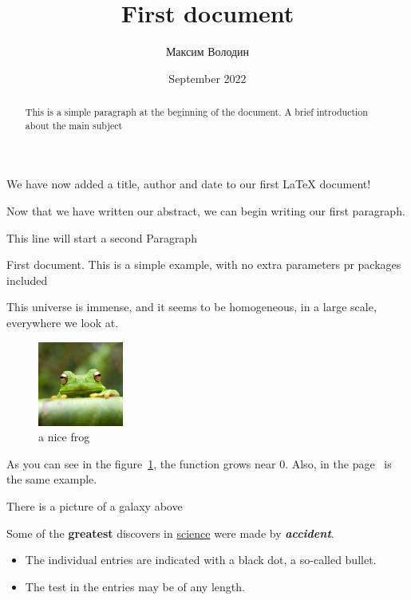 \documentclass[a4paper, 14pt]{article}
\title {First document} %
\author {Максим Володин}
\date {September 2022}
\begin{document}

    \maketitle
    We have now added a title, author and date to our first \LaTeX{} document!

    \tableofcontents

    \begin {abstract}
        This is a simple paragraph at the beginning of the document.
        A brief introduction about the main subject
    \end{abstract}

    Now that we have written our abstract, we can begin writing our first paragraph.

    This line will start a second Paragraph

    First document.
    This is a simple example, with no extra parameters pr packages included

    This universe is immense, and it seems to be homogeneous, in a large scale, everywhere we look at.

    \begin {figure} [h] %
        \centering
        \includegraphics [width = 0.25\textwidth]{frog}
        \caption {a nice frog}
        \label{fig:mesh1}
    \end{figure}

    As you can see in the figure~\ref{fig:mesh1}, the function grows near 0.
    Also, in the page~\pageref{fig:mesh1} is the same example.

    There is a picture of a galaxy above


    Some of the \textbf{greatest}
    discovers in \underline {science}
    were made by \textbf{\textit{accident}}.



    \begin {itemize}
        \item The individual entries are indicated with a black dot, a so-called bullet.
        \item The test in the entries may be of any length.
    \end {itemize}
\end{document}
